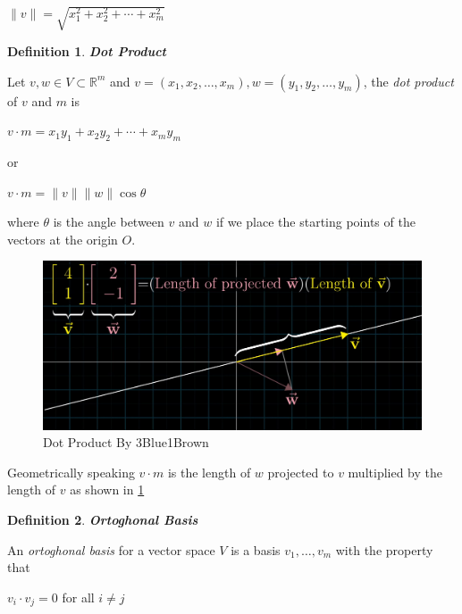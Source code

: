 \documentclass[a4paper,12pt]{report}
\newtheorem{definition}{Definition}[section]
\newcommand{\R}{\mathbb{R}}
\newcommand{\dd}{\cdot}
\begin{document}
\begin{center}
    $\lVert v \rVert = \sqrt{x_1^2 + x_2^2 + \cdots + x_m^2}$
\end{center}

\begin{definition}
    \textbf{Dot Product}
\end{definition}

Let $v, w \in V \subset \R^m$ and $v = (x_1, x_2, \ldots, x_m), w = (y_1, y_2, \ldots, y_m)$, the \textit{dot product} of $v$ and $m$ is

\begin{center}
    $v \dd m = x_1y_1 + x_2y_2 + \cdots + x_my_m$

    or

    $v \dd m = \lVert v \rVert \lVert w \rVert \cos{\theta}$
\end{center}

where $\theta$ is the angle between $v$ and $w$ if we place the starting points of the vectors at the origin $O$.

\begin{figure}[!b]
    \centering
    \includegraphics[scale=0.2]{./img/dot_product.png}
    \caption{Dot Product By 3Blue1Brown \cite{3b1b}}
    \label{fig:dot_product}
\end{figure}

Geometrically speaking $v \cdot m$ is the length of $w$ projected to $v$ multiplied by the length of $v$ as shown in \ref{fig:dot_product}

\begin{definition}
    \textbf{Ortoghonal Basis} 
\end{definition}

An \textit{ortoghonal basis} for a vector space $V$ is a basis $v_1, \ldots, v_m$ with the property that

\begin{center}
    $v_i \dd v_j = 0$ for all $i \neq j$
\end{center}
\end{document}
